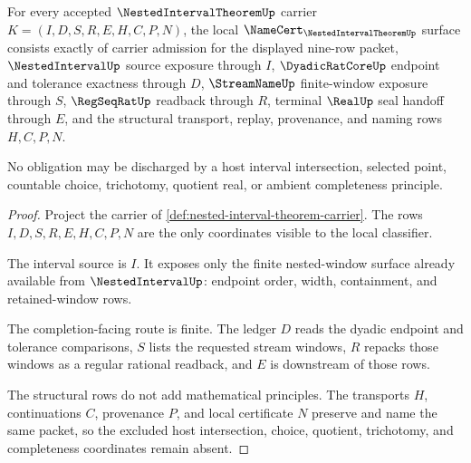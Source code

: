 \begin{theorem}
\label{thm:nested-interval-theorem-namecert-obligations}
For every accepted $\NestedIntervalTheoremUp$ carrier $K=(I,D,S,R,E,H,C,P,N)$, the local $\NameCert_{\NestedIntervalTheoremUp}$ surface consists exactly of carrier admission for the displayed nine-row packet, $\NestedIntervalUp$ source exposure through $I$, $\DyadicRatCoreUp$ endpoint and tolerance exactness through $D$, $\StreamNameUp$ finite-window exposure through $S$, $\RegSeqRatUp$ readback through $R$, terminal $\RealUp$ seal handoff through $E$, and the structural transport, replay, provenance, and naming rows $H,C,P,N$.

No obligation may be discharged by a host interval intersection, selected point, countable choice, trichotomy, quotient real, or ambient completeness principle.
\end{theorem}
\begin{proof}
Project the carrier of \autoref{def:nested-interval-theorem-carrier}. The rows $I,D,S,R,E,H,C,P,N$ are the only coordinates visible to the local classifier.

The interval source is $I$. It exposes only the finite nested-window surface already available from $\NestedIntervalUp$: endpoint order, width, containment, and retained-window rows.

The completion-facing route is finite. The ledger $D$ reads the dyadic endpoint and tolerance comparisons, $S$ lists the requested stream windows, $R$ repacks those windows as a regular rational readback, and $E$ is downstream of those rows.

The structural rows do not add mathematical principles. The transports $H$, continuations $C$, provenance $P$, and local certificate $N$ preserve and name the same packet, so the excluded host intersection, choice, quotient, trichotomy, and completeness coordinates remain absent.
\end{proof}


